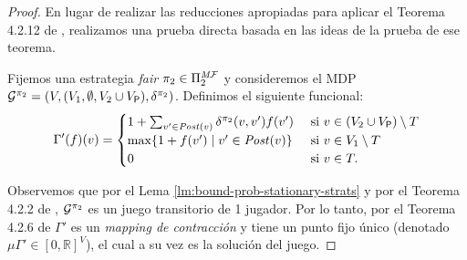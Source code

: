 \begin{proof}
  En lugar de realizar las reducciones apropiadas para aplicar el Teorema 4.2.12 de \cite[p.~174]{FilarV96}, realizamos una prueba directa basada en las ideas
  de la prueba de ese teorema.
  
  Fijemos una estrategia \textit{fair} $\pi_{2} \in \Pi^{\textit{M}\mathcal{F}}_{2}$ y
  consideremos el MDP
  $\mathcal{G}^{\pi_{2}} = (V, (V_1, \emptyset, V_2 \cup V_{\mathsf{P}}), \delta^{\pi_{2}})$.
  Definimos el siguiente funcional:
  \[
  \Gamma'(f)(v) =
  \begin{cases}
    1 + \sum_{v' \in \mathit{Post}(v)} \delta^{\pi_{2}}(v,v')  f(v') & \text{ si } v \in (V_2 \cup V_{\mathsf{P}}) \setminus T  \\
    \max \{1  + f(v') \mid v' \in \mathit{Post}(v) \} & \text{ si } v \in  V_1 \setminus T \\
    0 & \text{ si } v \in T.
  \end{cases}
  \]
  
  Observemos que por el Lema \ref{lm:bound-prob-stationary-strats} y por el Teorema 4.2.2 de \cite{FilarV96},  $\mathcal{G}^{\pi_{2}}$
  es un juego transitorio de 1 jugador. Por lo tanto, por el Teorema 4.2.6 de \cite{FilarV96} $\Gamma'$ es un \textit{mapping de contracción} y tiene un punto fijo único (denotado $\mu \Gamma' \in [0,\mathbb{R}]^V$), el cual a su vez es la solución del juego.
  

\end{proof}
